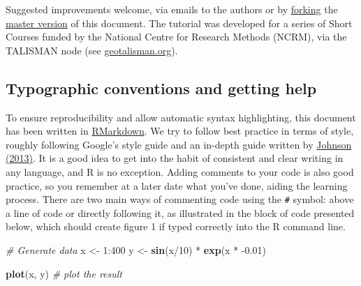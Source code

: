 \documentclass[]{article}
\newenvironment{Shaded}{}{}
\newcommand{\KeywordTok}[1]{\textcolor[rgb]{0.00,0.44,0.13}{\textbf{{#1}}}}
\newcommand{\DecValTok}[1]{\textcolor[rgb]{0.25,0.63,0.44}{{#1}}}
\newcommand{\FloatTok}[1]{\textcolor[rgb]{0.25,0.63,0.44}{{#1}}}
\newcommand{\StringTok}[1]{\textcolor[rgb]{0.25,0.44,0.63}{{#1}}}
\newcommand{\CommentTok}[1]{\textcolor[rgb]{0.38,0.63,0.69}{\textit{{#1}}}}
\newcommand{\NormalTok}[1]{{#1}}
\begin{document}
Suggested improvements welcome, via emails to the authors or by
\href{https://help.github.com/articles/fork-a-repo}{forking} the
\href{https://github.com/Robinlovelace/Creating-maps-in-R/blob/master/intro-spatial.Rmd}{master
version} of this document. The tutorial was developed for a series of
Short Courses funded by the National Centre for Research Methods (NCRM),
via the TALISMAN node (see
\href{http://www.geotalisman.org/}{geotalisman.org}).

\subsection{Typographic conventions and getting
help}\label{typographic-conventions-and-getting-help}

To ensure reproducibility and allow automatic syntax highlighting, this
document has been written in
\href{http://rmarkdown.rstudio.com/}{RMarkdown}. We try to follow best
practice in terms of style, roughly following Google's style guide and
an in-depth guide written by
\href{http://cran.r-project.org/web/packages/rockchalk/vignettes/Rstyle.pdf}{Johnson
(2013)}. It is a good idea to get into the habit of consistent and clear
writing in any language, and R is no exception. Adding comments to your
code is also good practice, so you remember at a later date what you've
done, aiding the learning process. There are two main ways of commenting
code using the \texttt{\#} symbol: above a line of code or directly
following it, as illustrated in the block of code presented below, which
should create figure 1 if typed correctly into the R command line.

\begin{Shaded}
\begin{Highlighting}[]
\CommentTok{# Generate data}
\NormalTok{x <-}\StringTok{ }\DecValTok{1}\NormalTok{:}\DecValTok{400}
\NormalTok{y <-}\StringTok{ }\KeywordTok{sin}\NormalTok{(x/}\DecValTok{10}\NormalTok{) *}\StringTok{ }\KeywordTok{exp}\NormalTok{(x *}\StringTok{ }\NormalTok{-}\FloatTok{0.01}\NormalTok{)}

\KeywordTok{plot}\NormalTok{(x, y)  }\CommentTok{# plot the result}
\end{Highlighting}
\end{Shaded}
\end{document}
